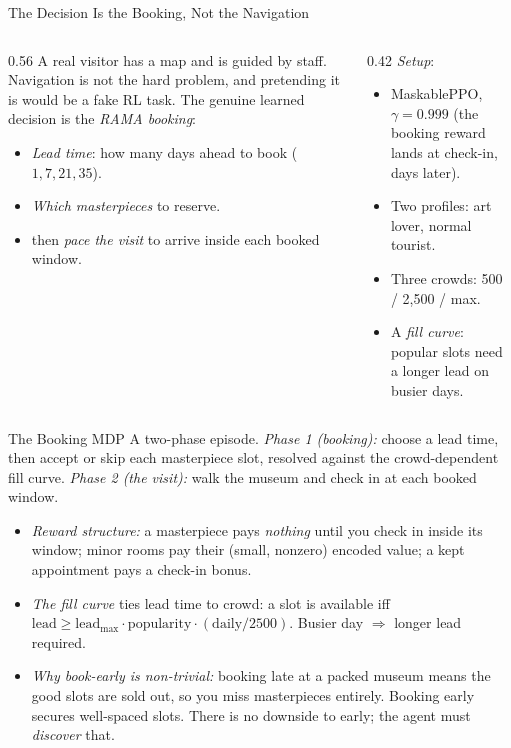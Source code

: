 \documentclass[aspectratio=169, 11pt]{beamer}
\newcommand{\emp}[1]{\textit{#1}}
\begin{document}
\begin{frame}{The Decision Is the Booking, Not the Navigation}
\footnotesize
\begin{columns}[T]
\begin{column}{0.56\textwidth}
A real visitor has a map and is guided by staff. Navigation is not the hard problem,
and pretending it is would be a fake RL task. The genuine learned decision is the
\emp{RAMA booking}:
\begin{itemize}\setlength\itemsep{2pt}
\item \emp{Lead time}: how many days ahead to book ($1, 7, 21, 35$).
\item \emp{Which masterpieces} to reserve.
\item then \emp{pace the visit} to arrive inside each booked window.
\end{itemize}
\end{column}
\begin{column}{0.42\textwidth}
\emp{Setup}:
\begin{itemize}\setlength\itemsep{2pt}
\item MaskablePPO, $\gamma=0.999$ (the booking reward lands at check-in, days later).
\item Two profiles: art lover, normal tourist.
\item Three crowds: 500 / 2{,}500 / max.
\item A \emp{fill curve}: popular slots need a longer lead on busier days.
\end{itemize}
\end{column}
\end{columns}
\end{frame}

\begin{frame}{The Booking MDP}
\footnotesize
A two-phase episode. \emp{Phase 1 (booking):} choose a lead time, then accept or skip
each masterpiece slot, resolved against the crowd-dependent fill curve. \emp{Phase 2
(the visit):} walk the museum and check in at each booked window.
\vspace{0.2em}
\begin{itemize}\setlength\itemsep{2pt}
\item \emp{Reward structure:} a masterpiece pays \emp{nothing} until you check in inside
      its window; minor rooms pay their (small, nonzero) encoded value; a kept
      appointment pays a check-in bonus.
\item \emp{The fill curve} ties lead time to crowd: a slot is available iff
      $\text{lead}\ge \text{lead}_{\max}\cdot\text{popularity}\cdot(\text{daily}/2500)$.
      Busier day $\Rightarrow$ longer lead required.
\item \emp{Why book-early is non-trivial:} booking late at a packed museum means the
      good slots are sold out, so you miss masterpieces entirely. Booking early secures
      well-spaced slots. There is no downside to early; the agent must \emp{discover} that.
\end{itemize}
\end{frame}
\end{document}
